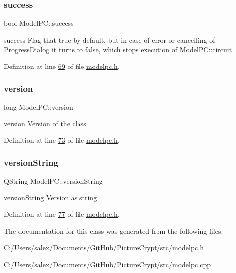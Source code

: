 \subsubsection{\texorpdfstring{success}{success}}
{\footnotesize\ttfamily bool Model\+P\+C\+::success}



success Flag that true by default, but in case of error or cancelling of Progress\+Dialog it turns to false, which stops execution of \mbox{\hyperlink{class_model_p_c_a1d0091062a0c836b283ec2f67411623b}{Model\+P\+C\+::circuit}} 



Definition at line \mbox{\hyperlink{modelpc_8h_source_l00069}{69}} of file \mbox{\hyperlink{modelpc_8h_source}{modelpc.\+h}}.

\mbox{\label{class_model_p_c_a5af48ab89e19be42a94c34ba00249401}} 
\subsubsection{\texorpdfstring{version}{version}}
{\footnotesize\ttfamily long Model\+P\+C\+::version}



version Version of the class 



Definition at line \mbox{\hyperlink{modelpc_8h_source_l00073}{73}} of file \mbox{\hyperlink{modelpc_8h_source}{modelpc.\+h}}.

\mbox{\label{class_model_p_c_a5f426725ccf7eefd3c77ea8c720264c9}} 
\subsubsection{\texorpdfstring{version\+String}{versionString}}
{\footnotesize\ttfamily Q\+String Model\+P\+C\+::version\+String}



version\+String Version as string 



Definition at line \mbox{\hyperlink{modelpc_8h_source_l00077}{77}} of file \mbox{\hyperlink{modelpc_8h_source}{modelpc.\+h}}.



The documentation for this class was generated from the following files\+:\begin{DoxyCompactItemize}
\item 
C\+:/\+Users/salex/\+Documents/\+Git\+Hub/\+Picture\+Crypt/src/\mbox{\hyperlink{modelpc_8h}{modelpc.\+h}}\item 
C\+:/\+Users/salex/\+Documents/\+Git\+Hub/\+Picture\+Crypt/src/\mbox{\hyperlink{modelpc_8cpp}{modelpc.\+cpp}}\end{DoxyCompactItemize}
